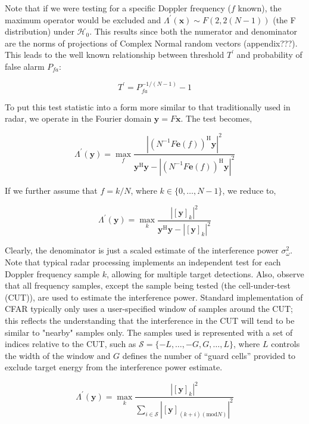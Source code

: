 \documentclass[11pt]{article}
\begin{document}
Note that if we were testing for a specific Doppler frequency ($f$ known), the maximum operator would be excluded and $\Lambda^\prime(\bm{x}) \sim F(2,2(N-1))$ (the F distribution) under $\mathcal{H}_0$. This results since both the numerator and denominator are the norms of projections of Complex Normal random vectors (appendix???). This leads to the well known relationship between threshold $T^\prime$ and probability of false alarm $P_{fa}$:

\begin{equation}
T^\prime = P_{fa}^{-1/(N-1)} - 1
\end{equation}

To put this test statistic into a form more similar to that traditionally used in radar, we operate in the Fourier domain $\bm{y}=F\bm{x}$. The test becomes,

\begin{equation}
\Lambda^\prime(\bm{y})= \max_f \frac{\left|\left( N^{-1}F\bm{e}(f)\right)^\text{H}\bm{y}\right|^2}{\bm{y}^\text{H}\bm{y} -\left|\left( N^{-1}F\bm{e}(f)\right)^\text{H}\bm{y}\right|^2}
\end{equation}

If we further assume that $f=k/N$, where $k \in \{0,\dots,N-1\}$, we reduce to,

\begin{equation}
\Lambda^\prime(\bm{y})= \max_k \frac{\left|[\bm{y}]_k\right|^2}{\bm{y}^\text{H}\bm{y} -\left|[\bm{y}]_k\right|^2}
\end{equation}

Clearly, the denominator is just a scaled estimate of the interference power $\sigma_\omega^2$. Note that typical radar processing implements an independent test for each Doppler frequency sample $k$, allowing for multiple target detections. Also, observe that all frequency samples, except the sample being tested (the cell-under-test (CUT)), are used to estimate the interference power. Standard implementation of CFAR typically only uses a user-specified window of samples around the CUT; this reflects the understanding that the interference in the CUT will tend to be similar to "nearby" samples only. The samples used is represented with a set of indices relative to the CUT, such as $\mathcal{S} = \{-L,\dots,-G,G,\dots,L\}$, where $L$ controls the width of the window and $G$ defines the number of ``guard cells'' provided to exclude target energy from the interference power estimate.

\begin{equation}
\Lambda^\prime(\bm{y})= \max_k \frac{\left|[\bm{y}]_k\right|^2}{\sum_{i \in \mathcal{S}}\left|[\bm{y}]_{(k+i)(\text{mod}N)}\right|^2}
\end{equation}
\end{document}

